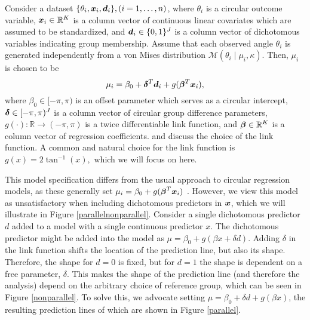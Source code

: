 Consider a dataset \( \{ \theta_i, \boldsymbol{x}_i, \boldsymbol{d}_i \}, (i = 1, \dots, n) \), where \( \theta_i  \) is a circular outcome variable, \( \boldsymbol{x}_i \in \mathbb{R}^K \) is a column vector of continuous linear covariates which are assumed to be standardized, and \( \boldsymbol{d}_i \in \{0, 1\}^J \) is a column vector of dichotomous variables indicating group membership. Assume that each observed angle $\theta_i$ is generated independently from a von Mises distribution \( \mathcal{M}(\theta_i \mid \mu_i, \kappa) \). Then, \( \mu_i \) is chosen to be
\begin{equation}
\mu_i = \beta_0 + \boldsymbol{\delta}^T \boldsymbol{d}_i + g(\boldsymbol{\beta}^T \boldsymbol{x}_i),
\end{equation}
where \( \beta_0 \in [-\pi, \pi) \) is an offset parameter which serves as a circular intercept, \( \boldsymbol{\delta} \in [-\pi, \pi)^J \) is a column vector of circular group difference parameters, \( g(\cdot) : \mathbb{R} \rightarrow (-\pi, \pi) \) is a twice differentiable link function, and \(\boldsymbol{\beta} \in \mathbb{R}^K \) is a column vector of regression coefficients. \citet{jammalamadaka2001topics} and \citet{fisher1992regression} discuss the choice of the link function. A common and natural choice for the link function is \( g(x) = 2 \tan^{-1}(x),\) which we will focus on here.

This model specification differs from the usual approach to circular regression models, as these generally set \( \mu_i = \beta_0 + g(\boldsymbol{\beta}^T \boldsymbol{x}_i)\) \citep{fisher1992regression, gill2010, lagona2016regression}. However, we view this model as unsatisfactory when including dichotomous predictors in \( \boldsymbol{x} \), which we will illustrate in Figure \ref{parallelnonparallel}. Consider a single dichotomous predictor \( d \) added to a model with a single continuous predictor \( x \). The dichotomous predictor might be added into the model as \( \mu = \beta_0 + g(\beta x + \delta d ) \). Adding \( \delta \) in the link function shifts the location of the prediction line, but also its shape. Therefore, the shape for \( d = 0 \) is fixed, but for \( d = 1 \) the shape is dependent on a free parameter, \( \delta \). This makes the shape of the prediction line (and therefore the analysis) depend on the arbitrary choice of reference group, which can be seen in Figure \ref{nonparallel}. To solve this, we advocate setting \( \mu = \beta_0 + \delta d + g(\beta x ) \), the resulting prediction lines of which are shown in Figure \ref{parallel}.


